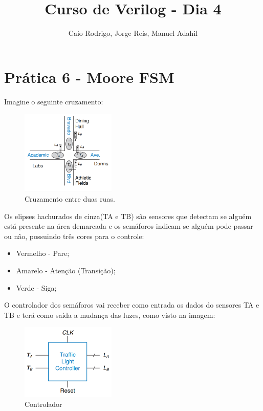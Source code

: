 \documentclass[a4paper]{article}
\title{Curso de Verilog - Dia 4}
\author{Caio Rodrigo, Jorge Reis, Manuel Adahil}
\date{} %
\begin{document}
\maketitle

\section*{Prática 6 - Moore FSM}
Imagine o seguinte cruzamento:

\begin{figure}[H]
	\centering
    \includegraphics[width=0.4\textwidth]{images/cruzamento.PNG}
    \caption*{Cruzamento entre duas ruas.}
\end{figure}

Os elipses hachurados de cinza(TA e TB) são sensores que detectam se alguém está presente na área demarcada e os semáforos indicam se alguém pode passar ou não, possuindo três cores para o controle:

\begin{itemize}
		\item Vermelho - Pare;
		\item Amarelo - Atenção (Transição);
		\item Verde - Siga;
\end{itemize}

O controlador dos semáforos vai receber como entrada os dados do sensores TA e TB e  terá como saída a mudança das luzes, como visto na imagem:

\begin{figure}[H]
	\centering
    \includegraphics[width=0.4\textwidth]{images/controlador.PNG}
    \caption*{Controlador}
\end{figure}
\end{document}
